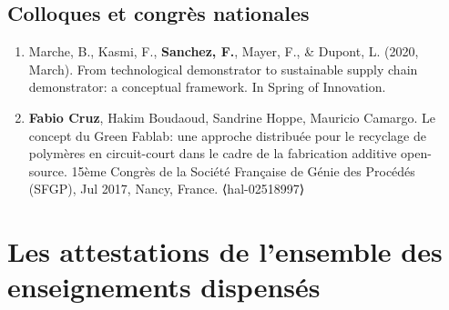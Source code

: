 \documentclass[
  12pt,
  oneside]{book}
\begin{document}
\hypertarget{colloques-et-congruxe8s-nationales}{%
\subsection{Colloques et congrès nationales}\label{colloques-et-congruxe8s-nationales}}

\begin{enumerate}
\def\labelenumi{\arabic{enumi}.}
\item
  Marche, B., Kasmi, F., \textbf{Sanchez, F.}, Mayer, F., \& Dupont, L. (2020, March). From technological demonstrator to sustainable supply chain demonstrator: a conceptual framework. In Spring of Innovation.
\item
  \textbf{Fabio Cruz}, Hakim Boudaoud, Sandrine Hoppe, Mauricio Camargo. Le concept du Green Fablab: une approche distribuée pour le recyclage de polymères en circuit-court dans le cadre de la fabrication additive open-source. 15ème Congrès de la Société Française de Génie des Procédés (SFGP), Jul 2017, Nancy, France. ⟨hal-02518997⟩
\end{enumerate}

\newpage

\hypertarget{les-attestations-de-lensemble-des-enseignements-dispensuxe9s}{%
\section{Les attestations de l'ensemble des enseignements dispensés}\label{les-attestations-de-lensemble-des-enseignements-dispensuxe9s}}


\end{document}
